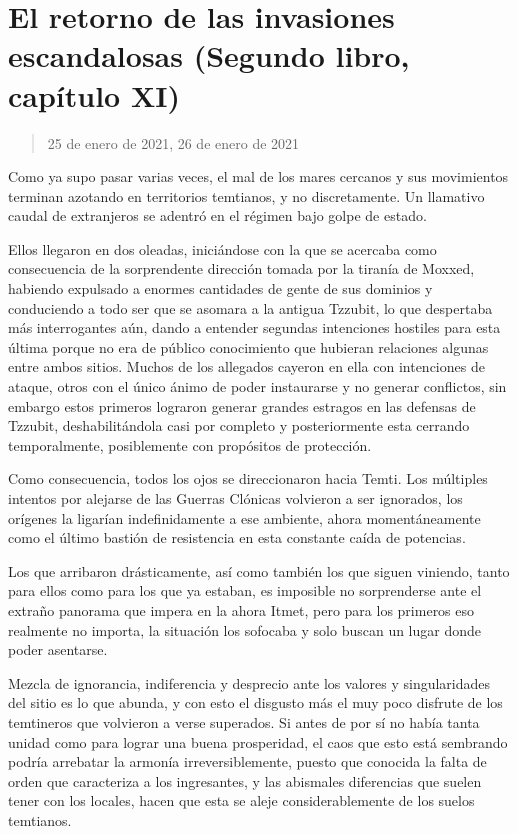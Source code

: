 \documentclass[
]{book}
\begin{document}
\hypertarget{el-retorno-de-las-invasiones-escandalosas-segundo-libro-capuxedtulo-xi}{%
\section{El retorno de las invasiones escandalosas (Segundo libro, capítulo XI)}\label{el-retorno-de-las-invasiones-escandalosas-segundo-libro-capuxedtulo-xi}}

\begin{quote}
25 de enero de 2021, 26 de enero de 2021
\end{quote}

Como ya supo pasar varias veces, el mal de los mares cercanos y sus movimientos terminan azotando en territorios temtianos, y no discretamente. Un llamativo caudal de extranjeros se adentró en el régimen bajo golpe de estado.

Ellos llegaron en dos oleadas, iniciándose con la que se acercaba como consecuencia de la sorprendente dirección tomada por la tiranía de Moxxed, habiendo expulsado a enormes cantidades de gente de sus dominios y conduciendo a todo ser que se asomara a la antigua Tzzubit, lo que despertaba más interrogantes aún, dando a entender segundas intenciones hostiles para esta última porque no era de público conocimiento que hubieran relaciones algunas entre ambos sitios. Muchos de los allegados cayeron en ella con intenciones de ataque, otros con el único ánimo de poder instaurarse y no generar conflictos, sin embargo estos primeros lograron generar grandes estragos en las defensas de Tzzubit, deshabilitándola casi por completo y posteriormente esta cerrando temporalmente, posiblemente con propósitos de protección.

Como consecuencia, todos los ojos se direccionaron hacia Temti. Los múltiples intentos por alejarse de las Guerras Clónicas volvieron a ser ignorados, los orígenes la ligarían indefinidamente a ese ambiente, ahora momentáneamente como el último bastión de resistencia en esta constante caída de potencias.

Los que arribaron drásticamente, así como también los que siguen viniendo, tanto para ellos como para los que ya estaban, es imposible no sorprenderse ante el extraño panorama que impera en la ahora Itmet, pero para los primeros eso realmente no importa, la situación los sofocaba y solo buscan un lugar donde poder asentarse.

Mezcla de ignorancia, indiferencia y desprecio ante los valores y singularidades del sitio es lo que abunda, y con esto el disgusto más el muy poco disfrute de los temtineros que volvieron a verse superados. Si antes de por sí no había tanta unidad como para lograr una buena prosperidad, el caos que esto está sembrando podría arrebatar la armonía irreversiblemente, puesto que conocida la falta de orden que caracteriza a los ingresantes, y las abismales diferencias que suelen tener con los locales, hacen que esta se aleje considerablemente de los suelos temtianos.
\end{document}
